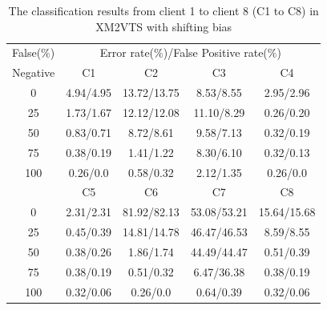 \begin{table}[ht]
\caption{The classification results from client 1 to client 8 (C1 to C8) in XM2VTS with shifting bias}
\begin{center}
\begin{tabular}{|c||c|c|c|c|}
\hline
{False($\%$)}&\multicolumn{4}{c|}{Error rate($\%$)/False Positive rate($\%$)}\\
\cline{2-5}
{Negative}&{C1}&{C2}&{C3}&{C4}\\
\hline
{0}&{4.94/4.95}&{13.72/13.75}&{8.53/8.55}&{2.95/2.96}\\
{25}&{1.73/1.67}&{12.12/12.08}&{11.10/8.29}&{0.26/0.20}\\
{50}&{0.83/0.71}&{8.72/8.61}&{9.58/7.13}&{0.32/0.19}\\
{75}&{0.38/0.19}&{1.41/1.22}&{8.30/6.10}&{0.32/0.13}\\
{100}&{0.26/0.0}&{0.58/0.32}&{2.12/1.35}&{0.26/0.0}\\
\cline{2-5}
\cline{2-5}
&{C5}&{C6}&{C7}&{C8}\\
\cline{2-5}
{0}&{2.31/2.31}&{81.92/82.13}&{53.08/53.21}&{15.64/15.68}\\
{25}&{0.45/0.39}&{14.81/14.78}&{46.47/46.53}&{8.59/8.55}\\
{50}&{0.38/0.26}&{1.86/1.74}&{44.49/44.47}&{0.51/0.39}\\
{75}&{0.38/0.19}&{0.51/0.32}&{6.47/36.38}&{0.38/0.19}\\
{100}&{0.32/0.06}&{0.26/0.0}&{0.64/0.39}&{0.32/0.06}\\
\hline
\end{tabular}
\label{tab:SVMResults}
\end{center}
\end{table}
